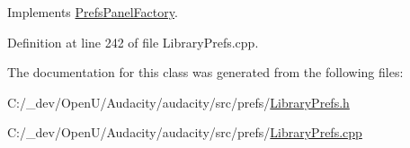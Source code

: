 Implements \hyperlink{class_prefs_panel_factory_a4814184d6050665a43f4929caa73aa0c}{Prefs\+Panel\+Factory}.



Definition at line 242 of file Library\+Prefs.\+cpp.



The documentation for this class was generated from the following files\+:\begin{DoxyCompactItemize}
\item 
C\+:/\+\_\+dev/\+Open\+U/\+Audacity/audacity/src/prefs/\hyperlink{_library_prefs_8h}{Library\+Prefs.\+h}\item 
C\+:/\+\_\+dev/\+Open\+U/\+Audacity/audacity/src/prefs/\hyperlink{_library_prefs_8cpp}{Library\+Prefs.\+cpp}\end{DoxyCompactItemize}
